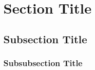 \section{Section Title}
\label{sec:Section Title}

\subsection{Subsection Title}
\label{subsec:Subsection Title}

\subsubsection{Subsubsection Title}
\label{bb:Subsubsection Title}





